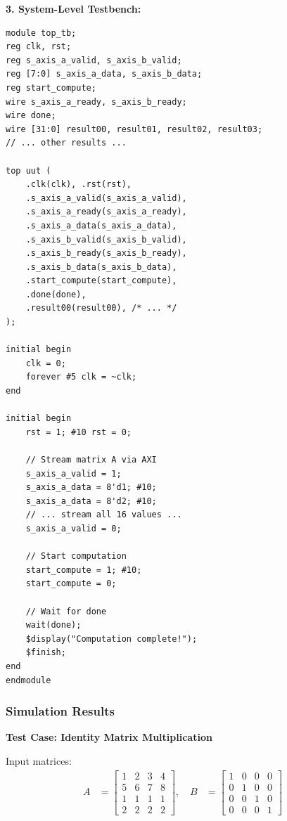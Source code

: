 \documentclass[12pt,a4paper]{article}
\begin{document}
\textbf{3. System-Level Testbench:}
\begin{lstlisting}[style=verilog,caption={Top-Level Integration Testbench (Excerpt)},label={lst:top_tb}]
module top_tb;
reg clk, rst;
reg s_axis_a_valid, s_axis_b_valid;
reg [7:0] s_axis_a_data, s_axis_b_data;
reg start_compute;
wire s_axis_a_ready, s_axis_b_ready;
wire done;
wire [31:0] result00, result01, result02, result03;
// ... other results ...

top uut (
    .clk(clk), .rst(rst),
    .s_axis_a_valid(s_axis_a_valid),
    .s_axis_a_ready(s_axis_a_ready),
    .s_axis_a_data(s_axis_a_data),
    .s_axis_b_valid(s_axis_b_valid),
    .s_axis_b_ready(s_axis_b_ready),
    .s_axis_b_data(s_axis_b_data),
    .start_compute(start_compute),
    .done(done),
    .result00(result00), /* ... */
);

initial begin
    clk = 0;
    forever #5 clk = ~clk;
end

initial begin
    rst = 1; #10 rst = 0;
    
    // Stream matrix A via AXI
    s_axis_a_valid = 1;
    s_axis_a_data = 8'd1; #10;
    s_axis_a_data = 8'd2; #10;
    // ... stream all 16 values ...
    s_axis_a_valid = 0;
    
    // Start computation
    start_compute = 1; #10;
    start_compute = 0;
    
    // Wait for done
    wait(done);
    $display("Computation complete!");
    $finish;
end
endmodule
\end{lstlisting}




\newpage


\subsubsection{Simulation Results}

\textbf{Test Case: Identity Matrix Multiplication}

Input matrices:
\begin{align*}
A &= \begin{bmatrix} 1 & 2 & 3 & 4 \\ 5 & 6 & 7 & 8 \\ 1 & 1 & 1 & 1 \\ 2 & 2 & 2 & 2 \end{bmatrix}, \quad
B &= \begin{bmatrix} 1 & 0 & 0 & 0 \\ 0 & 1 & 0 & 0 \\ 0 & 0 & 1 & 0 \\ 0 & 0 & 0 & 1 \end{bmatrix}
\end{align*}
\end{document}
